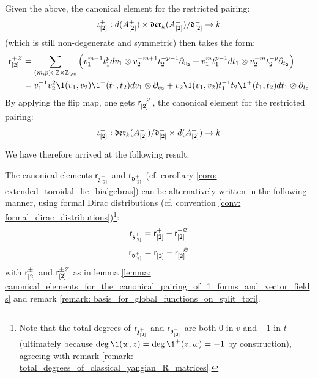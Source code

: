 \begin{remark}
            Given the above, the canonical element for the restricted pairing:
                $$\iota_{[2]}^+: d(A_{[2]}^+) \x \der_k( A_{[2]}^- )/\d_{[2]}^- \to k$$
            (which is still non-degenerate and symmetric) then takes the form:
                $$
                    \begin{aligned}
                        \sfr_{[2]}^{+ \varnothing} & = \sum_{(m, p) \in \Z \x \Z_{\geq 0}} \left( v_1^{m - 1} t_1^p dv_1 \tensor v_2^{-m + 1} t_2^{-p - 1} \del_{v_2} + v_1^m t_1^{p - 1} dt_1 \tensor v_2^{-m} t_2^{-p} \del_{t_2} \right)
                        \\
                        & = v_1^{-1} v_2^2 \1(v_1, v_2) \1^+(t_1, t_2) dv_1 \tensor \del_{v_2} + v_2 \1(v_1, v_2) t_1^{-1} t_2 \1^+(t_1, t_2) dt_1 \tensor \del_{t_2}
                    \end{aligned}
                $$
            By applying the flip map, one gets $\mathsf{r}_{[2]}^{- \varnothing}$, the canonical element for the restricted pairing:
                $$\iota_{[2]}^-: \der_k( A_{[2]}^- )/\d_{[2]}^- \x d(A_{[2]}^+) \to k$$
        \end{remark}
        We have therefore arrived at the following result:
        \begin{proposition} \label{prop: toroidal_classical_R_matrices_in_terms_of_formal_distributions}
            The canonical elements $\mathsf{r}_{\mathfrak{z}_{[2]}^+}$ and $\mathsf{r}_{\mathfrak{d}_{[2]}^+}$ (cf. corollary \ref{coro: extended_toroidal_lie_bialgebras}) can be alternatively written in the following manner, using formal Dirac distributions (cf. convention \ref{conv: formal_dirac_distributions})\footnote{Note that the total degrees of $\mathsf{r}_{\mathfrak{z}_{[2]}^+}$ and $\mathsf{r}_{\mathfrak{d}_{[2]}^+}$ are both $0$ in $v$ and $-1$ in $t$ (ultimately because $\deg \1(w, z) = \deg \1^+(z, w) = -1$ by construction), agreeing with remark \ref{remark: total_degrees_of_classical_yangian_R_matrices}.}:
                $$\mathsf{r}_{\mathfrak{z}_{[2]}^+} = \mathsf{r}_{[2]}^+ - \mathsf{r}_{[2]}^{+ \varnothing}$$
                $$\mathsf{r}_{\mathfrak{d}_{[2]}^+} = \mathsf{r}_{[2]}^- - \mathsf{r}_{[2]}^{- \varnothing}$$
            with $\mathsf{r}_{[2]}^{\pm}$ and $\mathsf{r}_{[2]}^{\pm \varnothing}$ as in lemma \ref{lemma: canonical_elements_for_the_canonical_pairing_of_1_forms_and_vector_fields} and remark \ref{remark: basis_for_global_functions_on_split_tori}. 
        \end{proposition}

        \newpage
        
